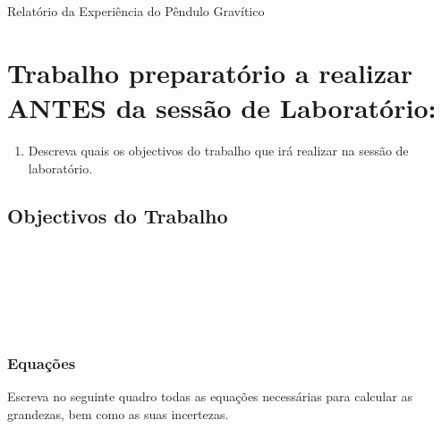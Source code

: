 \documentclass[a4paper,12pt]{article}      %
\author{Prof. Bernardo B. Carvalho}
\date{ Setembro 2017}
\begin{document}
 
{  \sf  Relatório da Experiência do Pêndulo Gravítico} %






\section{\sf Trabalho preparatório a realizar ANTES da sessão de Laboratório:}
\begin{enumerate}
\item Descreva quais os objectivos do trabalho que irá realizar na sessão de laboratório. 
\end{enumerate}

\subsection{\sf Objectivos do Trabalho}
\noindent\underline{\makebox[\textwidth][r]{~}} \\
\noindent\underline{\makebox[\textwidth][r]{~}} \\
\noindent\underline{\makebox[\textwidth][r]{~}} \\
\noindent\underline{\makebox[\textwidth][r]{~}} \\
\noindent\underline{\makebox[\textwidth][r]{~}} \\

\subsubsection{\sf Equações }
Escreva no seguinte quadro todas as equações necessárias para calcular as grandezas, bem como as suas incertezas.

\end{document}

